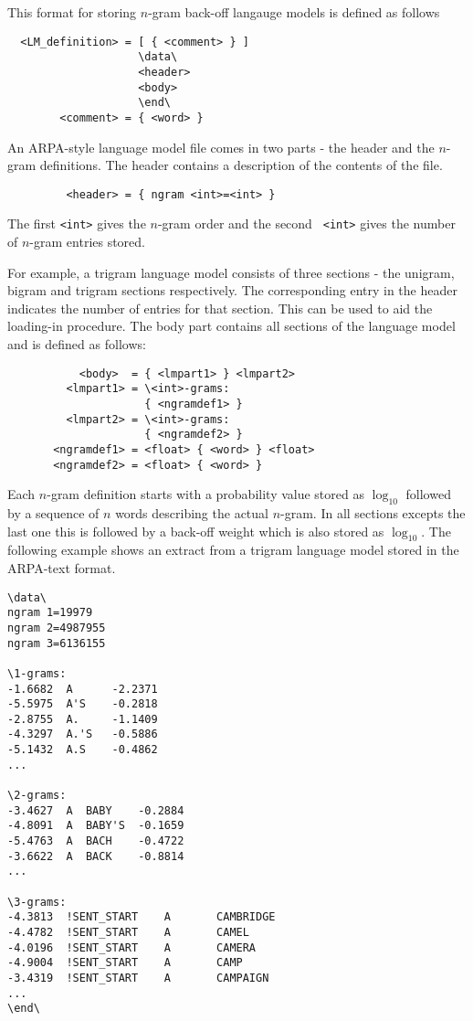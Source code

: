 This format for storing $n$-gram back-off langauge models is defined
as follows
\begin{verbatim}
  <LM_definition> = [ { <comment> } ] 
                    \data\ 
                    <header> 
                    <body> 
                    \end\
        <comment> = { <word> }
\end{verbatim}
An ARPA-style language model file comes in two parts - the header and
the $n$-gram definitions. The header contains a description of the
contents of the file.
\begin{verbatim}
         <header> = { ngram <int>=<int> }
\end{verbatim}
The first {\tt <int>} gives the $n$-gram order and the second {\tt
<int>} gives the number of $n$-gram entries stored.

For example, a trigram language model consists of three sections - the
unigram, bigram and trigram sections respectively. The corresponding
entry in the header indicates the number of entries for that
section. This can be used to aid the loading-in procedure. The body
part contains all sections of the language model and is defined as
follows:
\begin{verbatim}
           <body>  = { <lmpart1> } <lmpart2>
         <lmpart1> = \<int>-grams: 
                     { <ngramdef1> }
         <lmpart2> = \<int>-grams: 
                     { <ngramdef2> }
       <ngramdef1> = <float> { <word> } <float>
       <ngramdef2> = <float> { <word> } 
\end{verbatim}
Each $n$-gram definition starts with a probability value stored as
$\log_{10}$ followed by a sequence of $n$ words describing the actual
$n$-gram. In all sections excepts the last one this is followed by a
back-off weight which is also stored as $\log_{10}$. The following
example shows an extract from a trigram language model stored in the
ARPA-text format.

\begin{verbatim}
\data\
ngram 1=19979
ngram 2=4987955
ngram 3=6136155

\1-grams:
-1.6682  A      -2.2371
-5.5975  A'S    -0.2818
-2.8755  A.     -1.1409
-4.3297  A.'S   -0.5886
-5.1432  A.S    -0.4862
...

\2-grams:
-3.4627  A  BABY    -0.2884
-4.8091  A  BABY'S  -0.1659
-5.4763  A  BACH    -0.4722
-3.6622  A  BACK    -0.8814
...

\3-grams:
-4.3813  !SENT_START    A       CAMBRIDGE
-4.4782  !SENT_START    A       CAMEL
-4.0196  !SENT_START    A       CAMERA
-4.9004  !SENT_START    A       CAMP
-3.4319  !SENT_START    A       CAMPAIGN
...
\end\
\end{verbatim}

